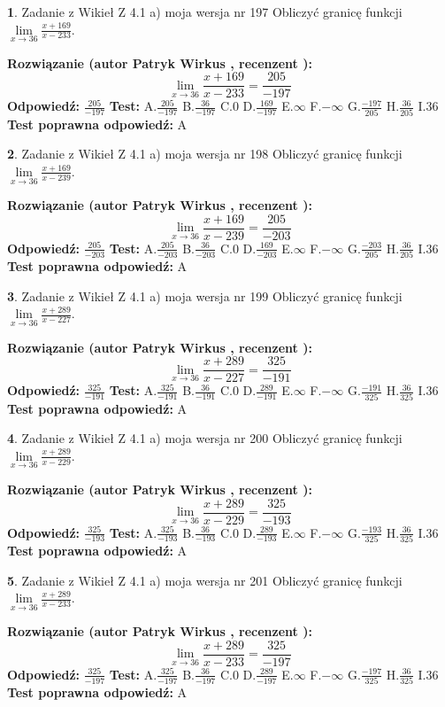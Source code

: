 \documentclass[12pt, a4paper]{article}
\theoremstyle{definition} %
\newtheorem{zad}{}
\newcommand{\zadStart}[1]{\begin{zad}#1\newline}
\newcommand{\zadStop}{\end{zad}}
\newcommand{\rozwStart}[2]{\noindent \textbf{Rozwiązanie (autor #1 , recenzent #2): }\newline}
\newcommand{\rozwStop}{\newline}
\newcommand{\odpStart}{\noindent \textbf{Odpowiedź:}\newline}
\newcommand{\odpStop}{\newline}
\newcommand{\testStart}{\noindent \textbf{Test:}\newline}
\newcommand{\testStop}{\newline}
\newcommand{\kluczStart}{\noindent \textbf{Test poprawna odpowiedź:}\newline}
\newcommand{\kluczStop}{\newline}
\begin{document}
\zadStart{Zadanie z Wikieł Z 4.1 a) moja wersja nr 197}
Obliczyć granicę funkcji $\lim\limits_{x\to36}\frac{x+169}{x-233}$.
\zadStop
\rozwStart{Patryk Wirkus}{}
$$\lim\limits_{x\to36}\frac{x+169}{x-233} = \frac{205}{-197}$$
\rozwStop
\odpStart
$\frac{205}{-197}$
\odpStop
\testStart
A.$\frac{205}{-197}$
B.$\frac{36}{-197}$
C.$0$
D.$\frac{169}{-197}$
E.$\infty$
F.$-\infty$
G.$\frac{-197}{205}$
H.$\frac{36}{205}$
I.$36$
\testStop
\kluczStart
A
\kluczStop



\zadStart{Zadanie z Wikieł Z 4.1 a) moja wersja nr 198}
Obliczyć granicę funkcji $\lim\limits_{x\to36}\frac{x+169}{x-239}$.
\zadStop
\rozwStart{Patryk Wirkus}{}
$$\lim\limits_{x\to36}\frac{x+169}{x-239} = \frac{205}{-203}$$
\rozwStop
\odpStart
$\frac{205}{-203}$
\odpStop
\testStart
A.$\frac{205}{-203}$
B.$\frac{36}{-203}$
C.$0$
D.$\frac{169}{-203}$
E.$\infty$
F.$-\infty$
G.$\frac{-203}{205}$
H.$\frac{36}{205}$
I.$36$
\testStop
\kluczStart
A
\kluczStop



\zadStart{Zadanie z Wikieł Z 4.1 a) moja wersja nr 199}
Obliczyć granicę funkcji $\lim\limits_{x\to36}\frac{x+289}{x-227}$.
\zadStop
\rozwStart{Patryk Wirkus}{}
$$\lim\limits_{x\to36}\frac{x+289}{x-227} = \frac{325}{-191}$$
\rozwStop
\odpStart
$\frac{325}{-191}$
\odpStop
\testStart
A.$\frac{325}{-191}$
B.$\frac{36}{-191}$
C.$0$
D.$\frac{289}{-191}$
E.$\infty$
F.$-\infty$
G.$\frac{-191}{325}$
H.$\frac{36}{325}$
I.$36$
\testStop
\kluczStart
A
\kluczStop



\zadStart{Zadanie z Wikieł Z 4.1 a) moja wersja nr 200}
Obliczyć granicę funkcji $\lim\limits_{x\to36}\frac{x+289}{x-229}$.
\zadStop
\rozwStart{Patryk Wirkus}{}
$$\lim\limits_{x\to36}\frac{x+289}{x-229} = \frac{325}{-193}$$
\rozwStop
\odpStart
$\frac{325}{-193}$
\odpStop
\testStart
A.$\frac{325}{-193}$
B.$\frac{36}{-193}$
C.$0$
D.$\frac{289}{-193}$
E.$\infty$
F.$-\infty$
G.$\frac{-193}{325}$
H.$\frac{36}{325}$
I.$36$
\testStop
\kluczStart
A
\kluczStop



\zadStart{Zadanie z Wikieł Z 4.1 a) moja wersja nr 201}
Obliczyć granicę funkcji $\lim\limits_{x\to36}\frac{x+289}{x-233}$.
\zadStop
\rozwStart{Patryk Wirkus}{}
$$\lim\limits_{x\to36}\frac{x+289}{x-233} = \frac{325}{-197}$$
\rozwStop
\odpStart
$\frac{325}{-197}$
\odpStop
\testStart
A.$\frac{325}{-197}$
B.$\frac{36}{-197}$
C.$0$
D.$\frac{289}{-197}$
E.$\infty$
F.$-\infty$
G.$\frac{-197}{325}$
H.$\frac{36}{325}$
I.$36$
\testStop
\kluczStart
A
\kluczStop
\end{document}
